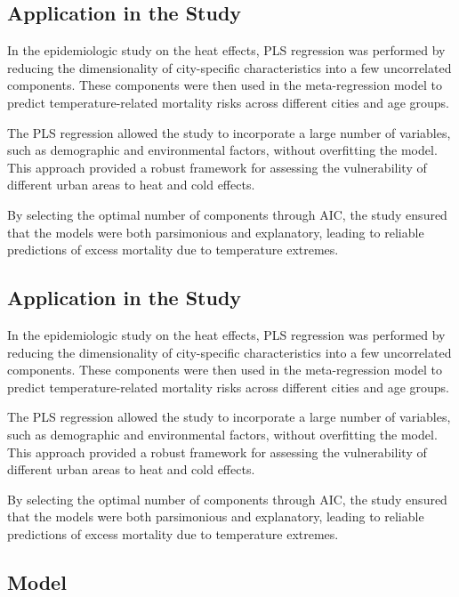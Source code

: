 \documentclass[
]{krantz}
\begin{document}
\subsection{Application in the Study}\label{application-in-the-study}

In the epidemiologic study on the heat effects, PLS regression was performed by reducing the dimensionality of city-specific characteristics into a few uncorrelated components. These components were then used in the meta-regression model to predict temperature-related mortality risks across different cities and age groups.

The PLS regression allowed the study to incorporate a large number of variables, such as demographic and environmental factors, without overfitting the model. This approach provided a robust framework for assessing the vulnerability of different urban areas to heat and cold effects.

By selecting the optimal number of components through AIC, the study ensured that the models were both parsimonious and explanatory, leading to reliable predictions of excess mortality due to temperature extremes.

\subsection{Application in the Study}\label{application-in-the-study-1}

In the epidemiologic study on the heat effects, PLS regression was performed by reducing the dimensionality of city-specific characteristics into a few uncorrelated components. These components were then used in the meta-regression model to predict temperature-related mortality risks across different cities and age groups.

The PLS regression allowed the study to incorporate a large number of variables, such as demographic and environmental factors, without overfitting the model. This approach provided a robust framework for assessing the vulnerability of different urban areas to heat and cold effects.

By selecting the optimal number of components through AIC, the study ensured that the models were both parsimonious and explanatory, leading to reliable predictions of excess mortality due to temperature extremes.

\subsection{Model}\label{model}
\end{document}
